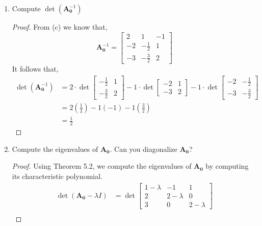 \documentclass[11pt]{scrartcl}
\begin{document}
\begin{enumerate}[label=\alph*.]
{\begin{proof}
	      \end{proof}
	      }
	\item{
	      Compute $\det(\mathbf{A}_{\mathbf{0}}^{-1})$
	      \begin{proof}
		      From (c) we know that,
		      $$
			      \mathbf{A}_{\mathbf{0}}^{-1} =
			      \begin{bmatrix}
				      2  & 1        & -1 \\
				      -2 & -\frac12 & 1  \\
				      -3 & -\frac32 & 2
			      \end{bmatrix}
		      $$
		      It follows that,
		      \begin{align*}
			      \det(\mathbf{A}_{\mathbf{0}}^{-1}) & = 2\cdot \det \begin{bmatrix}-\frac{1}{2}&1\\ -\frac{3}{2}&2\end{bmatrix}-1\cdot \det \begin{bmatrix}-2&1\\ -3&2\end{bmatrix}-1\cdot \det \begin{bmatrix}-2&-\frac{1}{2}\\ -3&-\frac{3}{2}\end{bmatrix} \\
			                                         & = 2 (\frac{1}{2}) -1 (-1) -1 (\frac{3}{2})                                                                             \\
			                                         & = \frac12
		      \end{align*}
	      \end{proof}
	      }
	\item{
	      Compute the eigenvalues of $\mathbf{A}_{\mathbf{0}}$. Can you diagonalize $\mathbf{A}_{\mathbf{0}}$?
	      \begin{proof}
		      Using Theorem 5.2, we compute the eigenvalues of $\mathbf{A}_{\mathbf{0}}$ by computing its
		      characteristic polynomial.
		      \begin{align*}
			      \det(\mathbf{A}_{\mathbf{0}} - \lambda I) & = \det \begin{bmatrix}
				      1 - \lambda & -1          & 1           \\
				      2           & 2 - \lambda & 0           \\
				      3           & 0           & 2 - \lambda
			      \end{bmatrix}         \\

\end{align*}
\end{proof}}
\end{enumerate}
\end{document}
